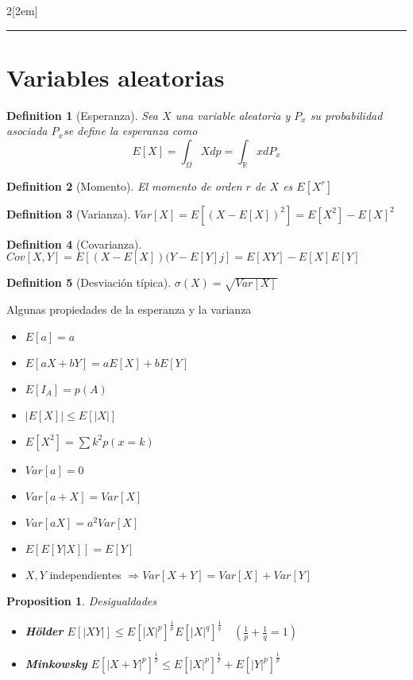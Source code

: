 \documentclass[leqno]{article}
\newtheorem*{proposition}{Proposition}
\newtheorem*{definition}{Definition}
\begin{document}
\begin{multicols}{2}[\columnsep2em]
\hrule

\section{Variables aleatorias}

\begin{definition}[Esperanza] Sea $X$ una variable aleatoria y  $P_x$ su probabilidad asociada $P_x$se define la esperanza como
   \[
E[X]= \int_\Omega Xdp = \int_{\mathbb{R}} xdP_x  
  \] 
\end{definition}

\begin{definition}[Momento] El momento de orden $r$ de  $X$ es  $E[X^r]$
\end{definition}

\begin{definition}[Varianza] $Var[X] = E[(X-E[X])^2] = E[X^2]-E[X]^2 $ 
\end{definition}

\begin{definition}[Covarianza] $Cov[X, Y] = E[(X-E[X])(Y-E[Y]j] = E[XY]-E[X]E[Y] $ 
\end{definition}

\begin{definition}[Desviación típica] $\sigma (X) = \sqrt{Var[X]} $
\end{definition}

\columnbreak

Algunas propiedades de la esperanza y la varianza
\begin{itemize}[topsep=-6pt, itemsep=0pt]
  \item $E[a]=a$
  \item $E[aX+bY]=aE[X]+bE[Y]$
  \item $E[I_A]=p(A)$
  \item $|E[X]|\le E[|X|]$
  \item $E[X^2] = \sum k^2 p(x=k)$
  \item $Var[a]=0$
  \item $Var[a+X] = Var[X]$
  \item $Var[aX]=a^2Var[X]$
  \item $E[E[Y|X]] = E[Y]$
  \item $X, Y$ independientes  $\Rightarrow Var[X+Y] = Var[X]+Var[Y]$
\end{itemize}

\begin{proposition}
Desigualdades
\begin{itemize}[topsep=-6pt, itemsep=0pt]
  \item \textbf{Hölder} $E[|XY|] \le  E[|X|^p]^{\frac{1}{p}}E[|X|^q]^{\frac{1}{q}} \quad (\frac{1}{p}+\frac{1}{q} =1)$ 
  \item \textbf{Minkowsky} $E[|X+Y|^p]^{\frac{1}{p}}\le E[|X|^p]^{\frac{1}{p}}+E[|Y|^p]^{\frac{1}{p}}$ 
\end{itemize}
\end{proposition}


\end{multicols}
\end{document}

